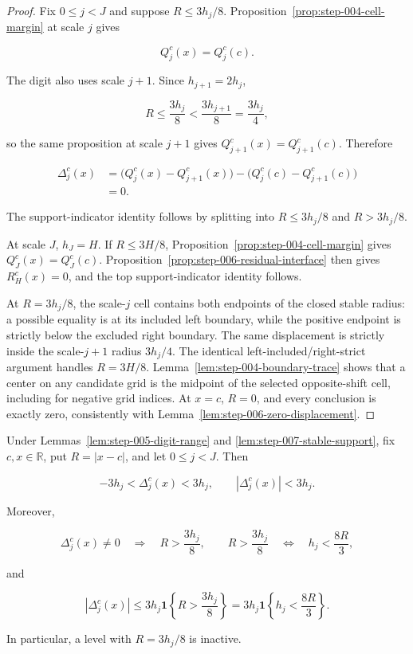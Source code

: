 \begin{proof}
Fix \(0\leq j<J\) and suppose \(R\leq3h_j/8\). Proposition~\ref{prop:step-004-cell-margin} at scale \(j\) gives

\[
Q_j^c(x)=Q_j^c(c).
\]

The digit also uses scale \(j+1\). Since \(h_{j+1}=2h_j\),

\[
R\leq\frac{3h_j}{8}
<\frac{3h_{j+1}}{8}
=\frac{3h_j}{4},
\]

so the same proposition at scale \(j+1\) gives \(Q_{j+1}^c(x)=Q_{j+1}^c(c)\). Therefore

\[
\begin{aligned}
\Delta_j^c(x)
&=\bigl(Q_j^c(x)-Q_{j+1}^c(x)\bigr)
  -\bigl(Q_j^c(c)-Q_{j+1}^c(c)\bigr)\\
&=0.
\end{aligned}
\]

The support-indicator identity follows by splitting into \(R\leq3h_j/8\) and \(R>3h_j/8\).

At scale \(J\), \(h_J=H\). If \(R\leq3H/8\), Proposition~\ref{prop:step-004-cell-margin} gives \(Q_J^c(x)=Q_J^c(c)\). Proposition~\ref{prop:step-006-residual-interface} then gives \(R_H^c(x)=0\), and the top support-indicator identity follows.

At \(R=3h_j/8\), the scale-\(j\) cell contains both endpoints of the closed stable radius: a possible equality is at its included left boundary, while the positive endpoint is strictly below the excluded right boundary. The same displacement is strictly inside the scale-\(j+1\) radius \(3h_j/4\). The identical left-included/right-strict argument handles \(R=3H/8\). Lemma~\ref{lem:step-004-boundary-trace} shows that a center on any candidate grid is the midpoint of the selected opposite-shift cell, including for negative grid indices. At \(x=c\), \(R=0\), and every conclusion is exactly zero, consistently with Lemma~\ref{lem:step-006-zero-displacement}.
\end{proof}

\begin{lemma}\label{lem:step-007-digit-envelope}
Under Lemmas~\ref{lem:step-005-digit-range} and
\ref{lem:step-007-stable-support}, fix \(c,x\in\mathbb R\), put
\(R=|x-c|\), and let \(0\leq j<J\). Then

\[
-3h_j<\Delta_j^c(x)<3h_j,
\qquad
|\Delta_j^c(x)|<3h_j.
\]

Moreover,

\[
\Delta_j^c(x)\neq0
\quad\Longrightarrow\quad
R>\frac{3h_j}{8},
\qquad
R>\frac{3h_j}{8}
\quad\Longleftrightarrow\quad
h_j<\frac{8R}{3},
\]

and

\[
|\Delta_j^c(x)|
\leq3h_j\mathbf 1\!\left\{R>\frac{3h_j}{8}\right\}
=3h_j\mathbf 1\!\left\{h_j<\frac{8R}{3}\right\}.
\]

In particular, a level with \(R=3h_j/8\) is inactive.
\end{lemma}

